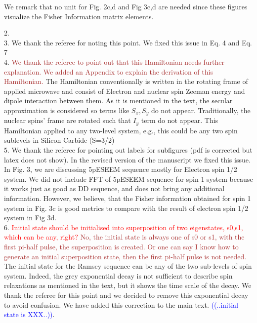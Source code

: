 \documentclass[12pt]{amsart}
\begin{document}
	We remark that no unit for Fig. 2c,d and Fig 3c,d are needed since these figures visualize the Fisher Information matrix elements. 
	
	2. \\
	
	3. We thank the referee for noting this point. We fixed this issue in Eq. 4 and Eq. 7  \\
	
	4. \textcolor{brown}{We thank the referee to point out that this Hamiltonian needs further explanation. We added an Appendix to explain the derivation of this Hamiltonian.} The Hamiltonian conventionally is written in the rotating frame of applied microwave and consist of Electron and nuclear spin Zeeman energy and dipole interaction between them. As it is mentioned in the text, the secular approximation is considered so terms like $S_x, S_y$ do not appear. Traditionally, the nuclear spins' frame are rotated such that $I_y$ term do not appear. This Hamiltonian applied to any two-level system, e.g., this could be any two spin sublevels in Silicon Carbide (S=3/2)\\
	
	5. We thank the referee for pointing out labels for subfigures (pdf is corrected but latex does not show). In the revised version of the manuscript we fixed this issue. 
	In Fig. 3, we are discussing 5pESEEM sequence mostly for Electron spin 1/2 system. 
	We did not include FFT of 5pESEEM sequence for spin 1 system because it works just as good as DD sequence, and does not bring any additional information. 
	However, we believe, that the Fisher information obtained for spin 1 system in Fig. 3c is good metrics to compare with the result of electron spin 1/2 system in Fig 3d.  \\
	
	6. \textcolor{red}{Initial state should be initialised into superposition of two eigenstates, s0,s1, which can be any, right?}
	\textcolor{brown}{No, the initial state is always one of s0 or s1, with the first pi-half pulse, the superposition is created. Or one can say I know how to generate an initial superposition state, then the first pi-half pulse is not needed.}
	The initial state for the Ramsey sequence can be any of the two sub-levels of spin system. Indeed, the grey exponential decay is not sufficient to describe spin relaxations as mentioned in the text, but it shows the time scale of the decay. We thank the referee for this point and we decided to remove this exponential decay to avoid confusion. We have added this correction to the main text.
	\textcolor{blue}{((..initial state is XXX..))}.\\
	 
\end{document}
